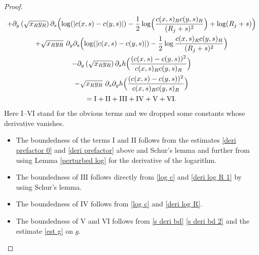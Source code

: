 \documentclass[JEP,XML,SOM,Unicode,published]{cedram}
\newcommand{\rI}{\mathrm{I}}
\newcommand{\rII}{\mathrm{II}}
\newcommand{\rIII}{\mathrm{III}}
\newcommand{\rIV}{\mathrm{IV}}
\newcommand{\rV}{\mathrm{V}}
\newcommand{\rVI}{\mathrm{VI}}
\theoremstyle{definition}
\let\de\partial
\begin{document}
\begin{proof}
\begin{multline*}
+\de_y\left(\sqrt{x_Ry_R}\right)\de_s \Bigl(\log(|c(x,s)-c(y,s)|)-\frac{1}{2}\log \Bigl(\frac{c(x,s)_Rc(y,s)_R}{(R_j+s)^2} \Bigr)+\log( R_j+s) \Bigr)\\
+\sqrt{x_Ry_R}\,\,\de_y\de_s \Bigl(\log(|c(x,s)-c(y,s)|)-\frac{1}{2}\log\frac{c(x,s)_Rc(y,s)_R}{(R_j+s)^2} \Bigr)\\
-\de_y\left(\sqrt{x_Ry_R}\right)\de_sh \Bigl(\frac{(c(x,s)-c(y,s))^2}{c(x,s)_Rc(y,s)_R} \Bigr)\\
-\sqrt{x_Ry_R}\,\,\de_s\de_yh \Bigl(\frac{(c(x,s)-c(y,s))^2}{c(x,s)_Rc(y,s)_R} \Bigr)\\
=\rI+\rII+\rIII+\rIV+\rV+\rVI.
\end{multline*}
Here $\rI$--$\rVI$ stand for the obvious terms and we dropped some constants whose derivative vanishes.

\begin{itemize}
\item
The boundedness of the terms $\rI$ and $\rII$ follows from the estimates \eqref{deri prefactor 0} and \eqref{deri prefactor} above and Schur's lemma and further from using Lemma \ref{perturbed log} for the derivative of the logarithm.

\item
The boundedness of $\rIII$ follows directly from \eqref{log c} and \eqref{deri log R 1} by using Schur's lemma.

\item
The boundedness of $\rIV$ follows from \eqref{log c} and \eqref{deri log R}.

\item
The boundedness of $\rV$ and $\rVI$ follows from \eqref{s deri bd} \resp \eqref{s deri bd 2} and the estimate \eqref{est g} on $g$.\qedhere
\end{itemize}
\end{proof}
\end{document}

